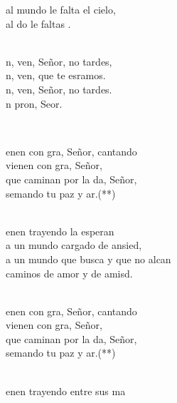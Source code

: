 \documentclass[12pt]{article}
\begin{document}
\begin{multicols*}{2}
\begin{cancion}
al mundo le falta el cielo,\\
	al do le faltas . \\\jump\\
	\begin{chorus}%
	n, ven, Señor, no tardes,\\
	n, ven, que te esramos.\\
	n, ven, Señor, no tardes.\\
	n pron, Seor.\\
	\end{chorus}%
	\jump\\
\end{cancion}%

\begin{cancion}%
	\begin{chorus}%
	enen con gra, Señor, cantando\\
	vienen con gra, Señor,\\
	 que caminan por la da, Señor,\\
	semando tu paz y ar.(**)\\
	\end{chorus}%
	\jump\\
	enen trayendo la esperan\\
	a un mundo cargado de ansied,\\
	a un mundo que busca y que no alcan\\
	caminos de amor y de amisd.\\\jump\\
	\begin{chorus}%
	enen con gra, Señor, cantando\\
	vienen con gra, Señor,\\
	 que caminan por la da, Señor,\\
	semando tu paz y ar.(**)\\
	\end{chorus}%
	\jump\\
	enen trayendo entre sus ma\\

\end{cancion}
\end{multicols*}
\end{document}
